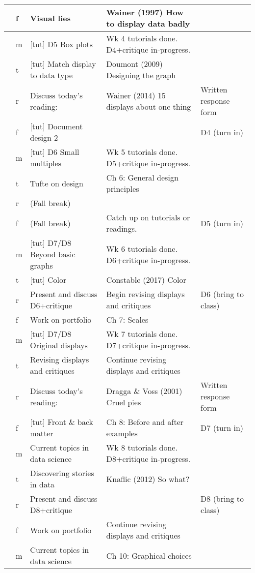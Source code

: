 \documentclass[oneside]{tufte-handout}\usepackage[]{graphicx}\usepackage[]{color}
\begin{document}
\begin{fullwidth}
\begin{table}[ht]
\begin{tabular}{>{\centering}m{3.5mm}>{\centering\sc}m{2.5mm}m{47mm}m{65mm}m{33mm}@{}}
    & f & Visual lies & Wainer (1997) How to display data badly &  \\ 
   \midrule 5 & m & [tut] D5 Box plots & Wk 4 tutorials done. D4+critique in-progress. &  \\ 
    & t & [tut] Match display to data type & Doumont (2009) Designing the graph &  \\ 
    & r & Discuss today's reading: & Wainer (2014) 15 displays about one thing & Written response form \\ 
    & f & [tut] Document design 2 &  & D4 (turn in) \\ 
   \midrule 6 & m & [tut] D6 Small multiples & Wk 5 tutorials done. D5+critique in-progress. &  \\ 
    & t & Tufte on design & Ch 6: General design principles &  \\ 
    & r & (Fall break) &  &  \\ 
    & f & (Fall break) & Catch up on tutorials or readings. & D5 (turn in) \\ 
   \midrule 7 & m & [tut] D7/D8 Beyond basic graphs & Wk 6 tutorials done. D6+critique in-progress. &  \\ 
    & t & [tut] Color & Constable (2017) Color &  \\ 
    & r & Present and discuss D6+critique & Begin revising displays and critiques & D6 (bring to class) \\ 
    & f & Work on portfolio & Ch 7: Scales &  \\ 
   \midrule 8 & m & [tut] D7/D8 Original displays & Wk 7 tutorials done. D7+critique in-progress. &  \\ 
    & t & Revising displays and critiques & Continue revising displays and critiques &  \\ 
    & r & Discuss today's reading: & Dragga \& Voss (2001) Cruel pies & Written response form \\ 
    & f & [tut] Front \& back matter & Ch 8: Before and after examples & D7 (turn in) \\ 
   \midrule 9 & m & Current topics in data science & Wk 8 tutorials done. D8+critique in-progress. &  \\ 
    & t & Discovering stories in data & Knaflic (2012) So what? &  \\ 
    & r & Present and discuss D8+critique &  & D8 (bring to class) \\ 
    & f & Work on portfolio & Continue revising displays and critiques &  \\ 
   \midrule 10 & m & Current topics in data science & Ch 10: Graphical choices &  \\ 

\end{tabular}
\end{table}
\end{fullwidth}
\end{document}
